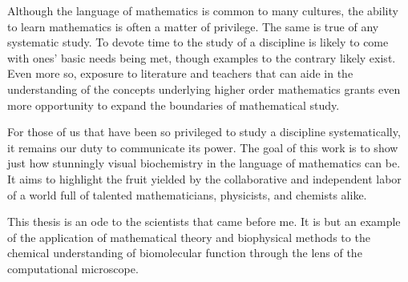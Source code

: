 \documentclass[12pt]{ucsddissertation}
\begin{document}
Although the language of mathematics is common to many cultures, the ability to learn mathematics is often a matter of privilege. The same is true of any systematic study. To devote time to the study of a discipline is likely to come with ones' basic needs being met, though examples to the contrary likely exist. Even more so, exposure to literature and teachers that can aide in the understanding of the concepts underlying higher order mathematics grants even more opportunity to expand the boundaries of mathematical study.

For those of us that have been so privileged to study a discipline systematically, it remains our duty to communicate its power. The goal of this work is to show just how stunningly visual biochemistry in the language of mathematics can be. It aims to highlight the fruit yielded by the collaborative and independent labor of a world full of talented mathematicians, physicists, and chemists alike. 

This thesis is an ode to the scientists that came before me. It is but an example of the application of mathematical theory and biophysical methods to the chemical understanding of biomolecular function through the lens of the computational microscope. 









\end{document}
